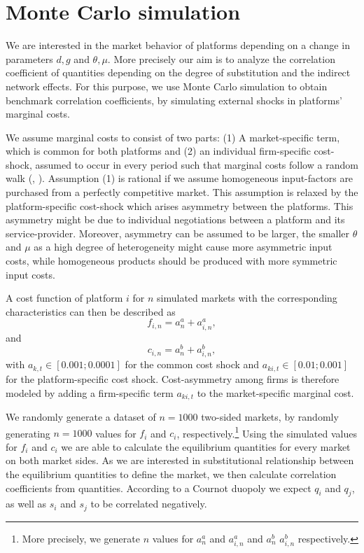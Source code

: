 \documentclass[12pt,a4paper,notitlepage]{article}
\begin{document}
\section{Monte Carlo simulation}

We are interested in the market behavior of platforms depending on a change in parameters $d, g$ and $\theta, \mu$. More precisely our aim is to analyze the correlation coefficient of quantities depending on the degree of substitution and the indirect network effects. For this purpose, we use Monte Carlo simulation to obtain benchmark correlation coefficients, by simulating external shocks in platforms' marginal costs. 

We assume marginal costs to consist of two parts: (1) A market-specific term, which is common for both platforms and (2) an individual firm-specific cost-shock, assumed to occur in every period such that marginal costs follow a random walk (\cite[241]{harrington_detecting_2008}, \cite{paha_empirical_2011}). Assumption (1) is rational if we assume homogeneous input-factors are purchased from a perfectly competitive market. This assumption is relaxed by the platform-specific cost-shock which arises asymmetry between the platforms. This asymmetry might be due to individual negotiations between a platform and its service-provider. Moreover, asymmetry can be assumed to be larger, the smaller $\theta$ and $\mu$ as a high degree of heterogeneity might cause more asymmetric input costs, while homogeneous products should be produced with more symmetric input costs. 



A cost function of platform $i$ for $n$ simulated markets with the corresponding characteristics can then be described as
\begin{equation}
f_{i,n} = a^a_n+a^a_{i,n},
\end{equation} and 
\begin{equation}
c_{i,n} = a^b_n+a^b_{i,n},
\end{equation}
with $a_{k,t} \in [0.001;0.0001]$ for the common cost shock and $a_{ki,t} \in [0.01;0.001] $ for the platform-specific cost shock. Cost-asymmetry among firms is therefore modeled by adding a firm-specific term $a_{ki,t}$ to the market-specific marginal cost. 

We randomly generate a dataset of $n=1000$ two-sided markets, by randomly generating $n=1000$ values for $f_i$ and $c_i$, respectively.\footnote{More precisely, we generate $n$ values for $a^a_n$ and $a^a_{i,n}$ and $a^b_n$ $a^b_{i,n}$ respectively.} Using the simulated values for $f_i$ and $c_i$ we are able to calculate the equilibrium quantities for every market on both market sides. As we are interested in substitutional relationship between the equilibrium quantities to define the market, we then calculate correlation coefficients from quantities. According to a Cournot duopoly we expect $q_i$ and $q_j$, as well as $s_i$ and $s_j$ to be correlated negatively. 
\end{document}
